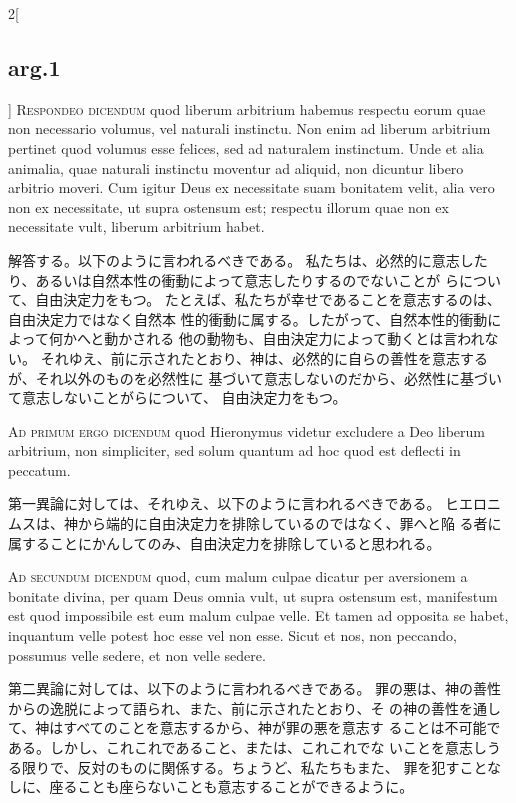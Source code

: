 \documentclass[paper=a4paper,fontsize=10pt,jafontsize=9pt,titlepage]{jlreq}
\begin{document}
\begin{paracol}{2}[\subsection{arg.1}]
{\scshape Respondeo dicendum} quod liberum arbitrium
habemus respectu eorum quae non necessario volumus, vel naturali
instinctu. Non enim ad liberum arbitrium pertinet quod volumus esse
felices, sed ad naturalem instinctum. Unde et alia animalia, quae
naturali instinctu moventur ad aliquid, non dicuntur libero arbitrio
moveri. Cum igitur Deus ex necessitate suam bonitatem velit, alia vero
non ex necessitate, ut supra ostensum est; respectu illorum quae non ex
necessitate vult, liberum arbitrium habet.

\switchcolumn

解答する。以下のように言われるべきである。
私たちは、必然的に意志したり、あるいは自然本性の衝動によって意志したりするのでないことが
 らについて、自由決定力をもつ。
たとえば、私たちが幸せであることを意志するのは、自由決定力ではなく自然本
 性的衝動に属する。したがって、自然本性的衝動によって何かへと動かされる
 他の動物も、自由決定力によって動くとは言われない。
それゆえ、前に示されたとおり、神は、必然的に自らの善性を意志するが、それ以外のものを必然性に
 基づいて意志しないのだから、必然性に基づいて意志しないことがらについて、
 自由決定力をもつ。

\switchcolumn*[\subsection{ad.1}]


{\scshape Ad primum ergo dicendum} quod Hieronymus
videtur excludere a Deo liberum arbitrium, non simpliciter, sed solum
quantum ad hoc quod est deflecti in peccatum.

\switchcolumn

第一異論に対しては、それゆえ、以下のように言われるべきである。
ヒエロニムスは、神から端的に自由決定力を排除しているのではなく、罪へと陥
 る者に属することにかんしてのみ、自由決定力を排除していると思われる。

\switchcolumn*[\subsection{ad.2}]


{\scshape Ad secundum dicendum} quod, cum malum culpae
dicatur per aversionem a bonitate divina, per quam Deus omnia vult, ut
supra ostensum est, manifestum est quod impossibile est eum malum culpae
velle. Et tamen ad opposita se habet, inquantum velle potest hoc esse
vel non esse. Sicut et nos, non peccando, possumus velle sedere, et non
velle sedere.

\switchcolumn

第二異論に対しては、以下のように言われるべきである。
罪の悪は、神の善性からの逸脱によって語られ、また、前に示されたとおり、そ
 の神の善性を通して、神はすべてのことを意志するから、神が罪の悪を意志す
 ることは不可能である。しかし、これこれであること、または、これこれでな
 いことを意志しうる限りで、反対のものに関係する。ちょうど、私たちもまた、
 罪を犯すことなしに、座ることも座らないことも意志することができるように。

\end{paracol}
\newpage
\end{document}
